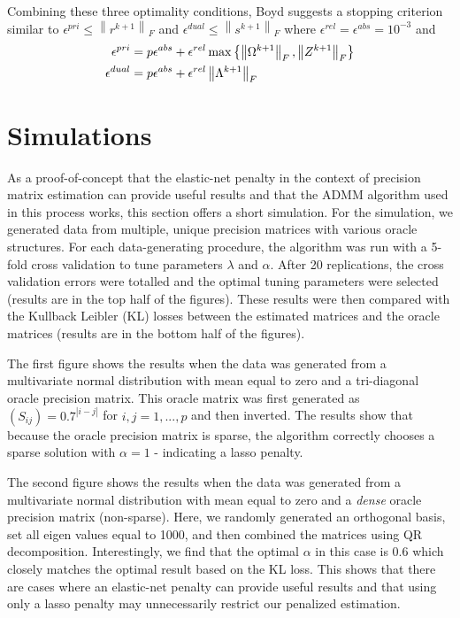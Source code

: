 \documentclass[11pt,]{report}
\theoremstyle{definition}
\theoremstyle{definition}
\theoremstyle{definition}
\theoremstyle{remark}
\begin{document}
Combining these three optimality conditions, Boyd suggests a stopping criterion similar to \(\epsilon^{pri} \leq \left\| r^{k + 1} \right\|_{F}\) and \(\epsilon^{dual} \leq \left\| s^{k + 1} \right\|_{F}\) where \(\epsilon^{rel} = \epsilon^{abs} = 10^{-3}\) and
\begin{equation}
\begin{split}
  \epsilon^{pri} &= p\epsilon^{abs} + \epsilon^{rel}\max\left\{ \left\| \Omega^{k + 1} \right\|_{F}, \left\| Z^{k + 1} \right\|_{F} \right\} \\
  \epsilon^{dual} &= p\epsilon^{abs} + \epsilon^{rel}\left\| \Lambda^{k + 1} \right\|_{F}
\end{split}
\label{eq:admmstopping}\notag
\end{equation}

\hypertarget{simulations}{%
\section{Simulations}\label{simulations}}

As a proof-of-concept that the elastic-net penalty in the context of precision matrix estimation can provide useful results and that the ADMM algorithm used in this process works, this section offers a short simulation. For the simulation, we generated data from multiple, unique precision matrices with various oracle structures. For each data-generating procedure, the algorithm was run with a 5-fold cross validation to tune parameters \(\lambda\) and \(\alpha\). After 20 replications, the cross validation errors were totalled and the optimal tuning parameters were selected (results are in the top half of the figures). These results were then compared with the Kullback Leibler (KL) losses between the estimated matrices and the oracle matrices (results are in the bottom half of the figures).

The first figure shows the results when the data was generated from a multivariate normal distribution with mean equal to zero and a tri-diagonal oracle precision matrix. This oracle matrix was first generated as \(\left(S_{ij}\right) = 0.7^{\left|i - j \right|}\) for \(i,j = 1,..., p\) and then inverted. The results show that because the oracle precision matrix is sparse, the algorithm correctly chooses a sparse solution with \(\alpha = 1\) - indicating a lasso penalty.

The second figure shows the results when the data was generated from a multivariate normal distribution with mean equal to zero and a \emph{dense} oracle precision matrix (non-sparse). Here, we randomly generated an orthogonal basis, set all eigen values equal to 1000, and then combined the matrices using QR decomposition. Interestingly, we find that the optimal \(\alpha\) in this case is 0.6 which closely matches the optimal result based on the KL loss. This shows that there are cases where an elastic-net penalty can provide useful results and that using only a lasso penalty may unnecessarily restrict our penalized estimation.
\end{document}
